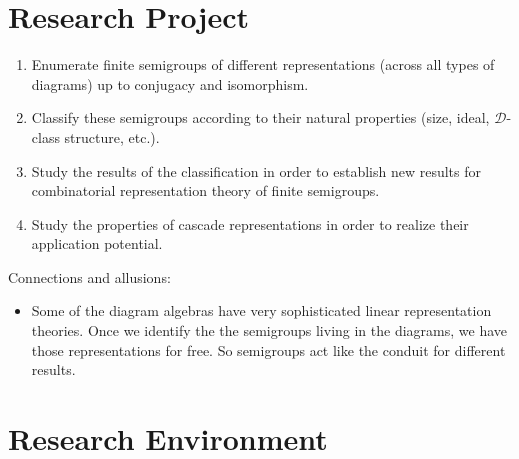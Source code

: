 \documentclass{amsart}
\newcommand{\cD}{\mathcal D}
\begin{document}
\section{Research Project}

\begin{enumerate}
\item Enumerate finite semigroups of different representations (across all types of diagrams) up to conjugacy and isomorphism.
\item Classify these semigroups according to their natural properties (size, ideal, $\cD$-class structure, etc.).
\item Study the results of the classification in order to establish new results for combinatorial representation theory of finite semigroups.
\item Study the properties of cascade representations in order to realize their application potential.
\end{enumerate}


Connections and allusions:
\begin{itemize}
\item Some of the diagram algebras have very sophisticated linear representation theories. Once we identify the the semigroups living in the diagrams, we have those representations for free. So semigroups act like the conduit for different results.
\end{itemize}


\section{Research Environment}






\end{document}
